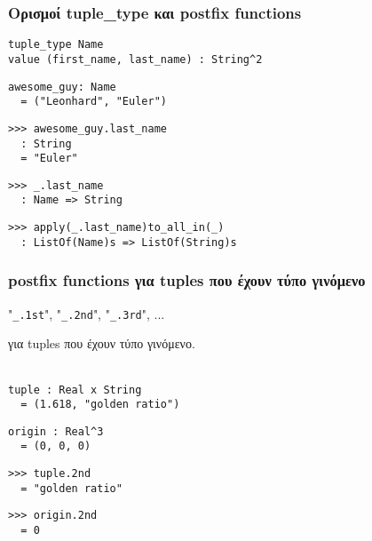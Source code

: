 \documentclass{beamer}
\def\e{\foreignlanguage{english}}
\begin{document}
\begin{frame}[fragile]

\frametitle{Ορισμοί \e{tuple\_type} και \e{postfix functions}}

\begin{otherlanguage}{english}
\begin{verbatim}
tuple_type Name
value (first_name, last_name) : String^2
\end{verbatim}
\begin{verbatim}
awesome_guy: Name
  = ("Leonhard", "Euler")
\end{verbatim}
\begin{verbatim}
>>> awesome_guy.last_name
  : String
  = "Euler"
\end{verbatim}
\begin{verbatim}
>>> _.last_name
  : Name => String
\end{verbatim}
\begin{verbatim}
>>> apply(_.last_name)to_all_in(_)
  : ListOf(Name)s => ListOf(String)s
\end{verbatim}
\end{otherlanguage}

\end{frame}

\begin{frame}[fragile]

\frametitle{\e{postfix functions} για \e{tuples} που έχουν τύπο γινόμενο}

\begin{otherlanguage}{english}
"\verb|_.1st|", "\verb|_.2nd|", "\verb|_.3rd|", ...
\end{otherlanguage}
για \e{tuples} που έχουν τύπο γινόμενο.
\\~\

\begin{otherlanguage}{english}
\begin{verbatim}
tuple : Real x String
  = (1.618, "golden ratio")
\end{verbatim}

\begin{verbatim}
origin : Real^3
  = (0, 0, 0)
\end{verbatim}

\begin{verbatim}
>>> tuple.2nd
  = "golden ratio"
\end{verbatim}

\begin{verbatim}
>>> origin.2nd
  = 0

\end{verbatim}
\end{otherlanguage}

\end{frame}
\end{document}
